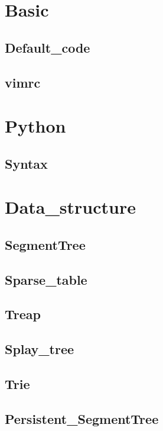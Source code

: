 \section{Basic}
    \subsection{Default\_code}
        
    \subsection{vimrc}
        
\section{Python}
    \subsection{Syntax}
        

\section{Data\_structure}
    \subsection{SegmentTree}
        
    \subsection{Sparse\_table}
        
    \subsection{Treap}
        
    \subsection{Splay\_tree}
        
    \subsection{Trie}
        
    \subsection{Persistent\_SegmentTree}
        
